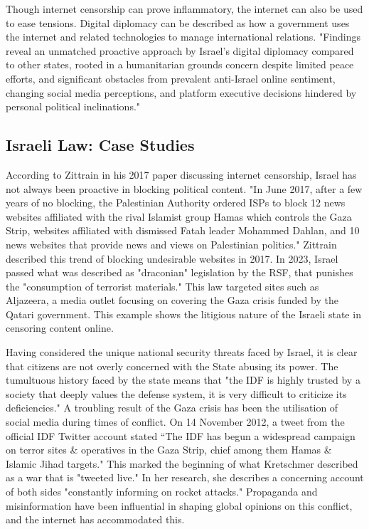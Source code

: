 Though internet censorship can prove inflammatory, the internet can also be used to ease tensions. Digital diplomacy can be described as how a government uses the internet and related technologies to manage international relations. "Findings reveal an unmatched proactive approach by Israel’s digital diplomacy compared to other states, rooted in a humanitarian grounds concern despite limited peace efforts, and significant obstacles from prevalent anti-Israel online sentiment, changing social media perceptions, and platform executive decisions hindered by personal political inclinations." \cite{Othman2025DigitalDiplomacy} 

\subsection{Israeli Law: Case Studies}
According to Zittrain in his 2017 paper discussing internet censorship, Israel has not always been proactive in blocking political content. "In June 2017, after a few years of no blocking, the Palestinian Authority ordered ISPs to block 12 news websites affiliated with the rival Islamist group Hamas which controls the Gaza Strip, websites affiliated with dismissed Fatah leader Mohammed Dahlan, and 10 news websites that provide news and views on Palestinian politics." \cite{zittrain2017shifting} Zittrain described this trend of blocking undesirable websites in 2017. In 2023, Israel passed what was described as "draconian" legislation by the RSF, that punishes the "consumption of terrorist materials." \cite{RSF2024IsraelCensorship} This law targeted sites such as Aljazeera, a media outlet focusing on covering the Gaza crisis funded by the Qatari government. \cite{AlJazeera2023Knesset} This example shows the litigious nature of the Israeli state in censoring content online. 

Having considered the unique national security threats faced by Israel, it is clear that citizens are not overly concerned with the State abusing its power. The tumultuous history faced by the state means that "the IDF is highly trusted by a society that deeply values the defense system, it is very difficult to criticize its deficiencies." \cite{MAGEN2018287} A troubling result of the Gaza crisis has been the utilisation of social media during times of conflict. On 14 November 2012, a tweet from the official IDF Twitter account stated “The IDF has begun a widespread campaign on terror sites \& operatives in the Gaza Strip, chief among them Hamas \& Islamic Jihad targets." \cite{IDF_Twitter} This marked the beginning of what Kretschmer described as a war that is "tweeted live." In her research, she describes a concerning account of both sides "constantly informing on rocket attacks." \cite {Kretschmer_2017} Propaganda and misinformation have been influential in shaping global opinions on this conflict, and the internet has accommodated this.

